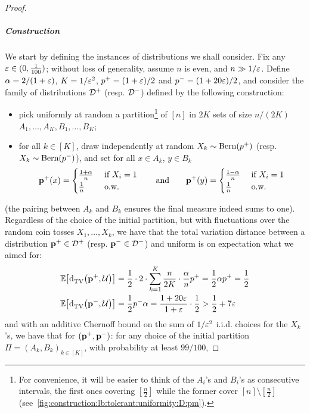 \begin{proof}
  \subparagraph{Construction} We start by defining the instances of distributions we shall consider. Fix any $\varepsilon\in(0,\frac{1}{100})$; without loss of generality, assume $n$ is even, and $n \gg 1/\varepsilon$. Define $\alpha = 2/(1+\varepsilon)$, $K= 1/\varepsilon^2$, $p^+ = (1+\varepsilon)/2$ and $p^- = (1+20\varepsilon)/2$, and consider the family of distributions $\mathcal{D}^+$ (resp. $\mathcal{D}^-$) defined by the following construction:
  \begin{itemize}
    \item pick uniformly at random a partition\footnote{For convenience, it will be easier to think of the $A_i$'s and $B_i$'s as consecutive intervals, the first ones covering $[\frac n 2]$ while the former cover $[n]\setminus[\frac n 2]$ (see~\cref{fig:construction:lb:tolerant:uniformity:D:pm}).} of $[n]$ in $2K$ sets of size $n/(2K)$ $A_1,\dots, A_K, B_1,\dots, B_K$;
    \item for all $k\in[K]$, draw independently at random $X_k\sim\operatorname{Bern}\!\left( p^+ \right)$ (resp. $X_k\sim\operatorname{Bern}\!\left( p^- \right)$), and set for all $x\in A_k$, $y\in B_k$
    \[
    \mathbf{p}^+(x)=\begin{cases}
      \frac{1+\alpha}{n} & \text{ if } X_i = 1 \\
      \frac{1}{n} & \text{ o.w.}
    \end{cases}
    \qquad\text{and}\qquad
    \mathbf{p}^+(y)=\begin{cases}
      \frac{1-\alpha}{n} & \text{ if } X_i = 1 \\
      \frac{1}{n} & \text{ o.w.}
    \end{cases}
    \]
  \end{itemize}
  (the pairing between $A_k$ and $B_k$ ensures the final measure indeed sums to one).
  Regardless of the choice of the initial partition, but with fluctuations over the random coin tosses $X_1,\dots, X_k$, we have that the total variation distance between a distribution $\mathbf{p}^+\in\mathcal{D}^+$ (resp. $\mathbf{p}^-\in\mathcal{D}^-$) and uniform is on expectation what we aimed for:
  \begin{align*}
  \mathbb{E}\!\left[ {\operatorname{d}_{\textrm{TV}}^{}\!\left({\mathbf{p}^+, \mathcal{U}}\right)} \right] &= \frac{1}{2}\cdot 2\cdot\sum_{k=1}^K \frac{n}{2K}\cdot\frac{\alpha}{n}p^+ = \frac{1}{2}\alpha p^+ = \frac{1}{2} \\
  \mathbb{E}\!\left[ {\operatorname{d}_{\textrm{TV}}^{}\!\left({\mathbf{p}^{-\vphantom{+}}, \mathcal{U}}\right)} \right] &= \frac{1}{2} p^-\alpha = \frac{1+20\varepsilon}{1+\varepsilon}\cdot\frac{1}{2} > \frac{1}{2} + 7\varepsilon
  \end{align*}
  and with an additive Chernoff bound    on the sum of $1/\varepsilon^2$ i.i.d. choices for the $X_k$'s, we have that for $(\mathbf{p}^+, \mathbf{p}^-)$: for any choice of the initial partition $\Pi=(A_k,B_k)_{k\in[K]}$, with probability at least $99/100$,

\end{proof}

